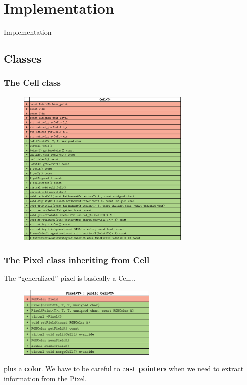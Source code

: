 \documentclass[8pt]{beamer}
\begin{document}
\section{Implementation}
\begin{frame}
 \begin{center}
  \begin{huge}
   Implementation
  \end{huge}
 \end{center}
\end{frame}


\subsection{Classes}
\begin{frame}
 \frametitle{The Cell class}
 \pause
  \begin{figure}[!h]
\begin{center}
\includegraphics[width=0.75\textwidth]{./figures/cell_h.eps}
\end{center}
\end{figure}
\end{frame}

\begin{frame}
 \frametitle{The Pixel class inheriting from Cell}\pause
 The ``generalized'' pixel is basically a Cell...
  \begin{figure}[!h]
\begin{center}
\includegraphics[width=0.6\textwidth]{./figures/pixel_h.eps}
\end{center}
\end{figure}
plus a \textbf{color}.
We have to be careful to \textbf{cast pointers} when we need to extract information from the Pixel.
\end{frame}
\end{document}

